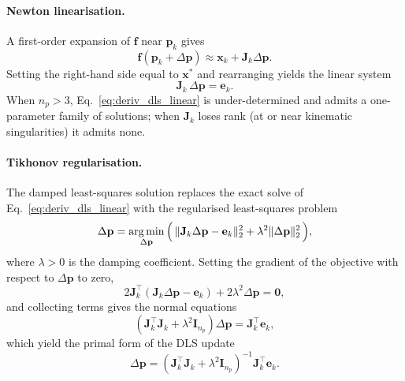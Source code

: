 \paragraph{Newton linearisation.}
A first-order expansion of $\mathbf{f}$ near $\mathbf{p}_{k}$ gives
\begin{equation}
  \mathbf{f}(\mathbf{p}_{k} + \Delta \mathbf{p}) \approx \mathbf{x}_{k} + \mathbf{J}_{k} \Delta \mathbf{p}.
\end{equation}
Setting the right-hand side equal to $\mathbf{x}^{*}$ and rearranging yields the linear system
\begin{equation}
  \mathbf{J}_{k}\, \Delta \mathbf{p} = \mathbf{e}_{k}.
  \label{eq:deriv_dls_linear}
\end{equation}
When $n_{p} > 3$, Eq.~\eqref{eq:deriv_dls_linear} is under-determined and admits a one-parameter family of solutions; when $\mathbf{J}_{k}$ loses rank (at or near kinematic singularities) it admits none.

\paragraph{Tikhonov regularisation.}
The damped least-squares solution replaces the exact solve of Eq.~\eqref{eq:deriv_dls_linear} with the regularised least-squares problem
\begin{equation}
  \Delta \mathbf{p} = \operatorname*{arg\,min}_{\Delta \mathbf{p}} \Big(\, \|\mathbf{J}_{k} \Delta \mathbf{p} - \mathbf{e}_{k}\|_{2}^{2} + \lambda^{2} \|\Delta \mathbf{p}\|_{2}^{2}\, \Big),
  \label{eq:deriv_dls_objective}
\end{equation}
where $\lambda > 0$ is the damping coefficient. Setting the gradient of the objective with respect to $\Delta \mathbf{p}$ to zero,
\begin{equation}
  2 \mathbf{J}_{k}^{\top}(\mathbf{J}_{k} \Delta \mathbf{p} - \mathbf{e}_{k}) + 2 \lambda^{2} \Delta \mathbf{p} = \mathbf{0},
\end{equation}
and collecting terms gives the normal equations
\begin{equation}
  (\mathbf{J}_{k}^{\top} \mathbf{J}_{k} + \lambda^{2} \mathbf{I}_{n_{p}}) \Delta \mathbf{p} = \mathbf{J}_{k}^{\top} \mathbf{e}_{k},
\end{equation}
which yield the primal form of the DLS update
\begin{equation}
  \Delta \mathbf{p} = (\mathbf{J}_{k}^{\top} \mathbf{J}_{k} + \lambda^{2} \mathbf{I}_{n_{p}})^{-1} \mathbf{J}_{k}^{\top} \mathbf{e}_{k}.
  \label{eq:deriv_dls_primal}
\end{equation}


